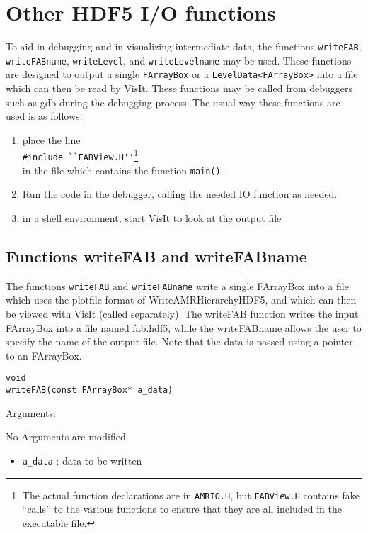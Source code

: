 \section{Other HDF5 I/O functions \label{sect:otherHDF5IO} }

To aid in debugging and in visualizing intermediate data, the
functions \protect\verb|writeFAB|, \protect\verb|writeFABname|,
\protect\verb|writeLevel|, and \protect\verb|writeLevelname| may be
used.  These functions are designed to output a single {\tt FArrayBox} or
a {\tt LevelData<FArrayBox>} into a file which can then be read by
VisIt. These functions may be called from debuggers such as gdb
during the debugging process.  The usual way these functions are used
is as follows:
\begin{enumerate}
\item
place the line \\
\protect\verb|#include ``FABView.H''|\footnote{The actual function
  declarations are in {\tt AMRIO.H}, but {\tt FABView.H}  contains
  fake ``calls'' to the various functions to ensure that they are
  all included in the executable file. } \\  
in the file which contains the function \verb|main()|.
\item
Run the code in the debugger, calling the needed IO function as
needed.
\item
in a shell environment, start VisIt to look at the output file
\end{enumerate}


\subsection{Functions writeFAB and writeFABname}
The functions \protect\verb|writeFAB| and \protect\verb|writeFABname|
write a single FArrayBox into a file which uses the plotfile format
of WriteAMRHierarchyHDF5, and which can then be viewed with VisIt
(called separately). The writeFAB function writes the input FArrayBox
into a file named fab.hdf5, while the writeFABname allows the user to
specify the name of the output file.  Note that the data is passed
using a pointer to an FArrayBox.

\begin{verbatim}
void
writeFAB(const FArrayBox* a_data)
\end{verbatim}  

Arguments:

No Arguments are modified.
\begin{itemize}
\item \verb|a_data| : data to be written
\end{itemize}

